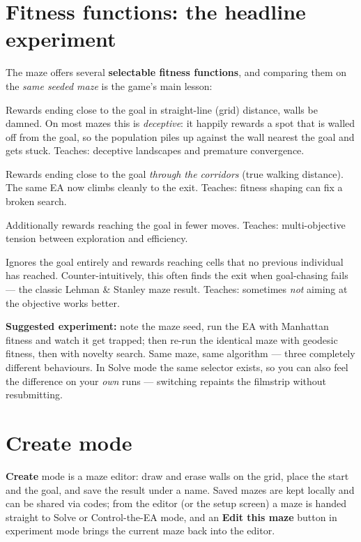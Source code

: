 \documentclass[11pt,a4paper]{report}
\newcommand{\uielem}[1]{\textsf{\textbf{#1}}} %
\begin{document}
\section{Fitness functions: the headline experiment}
\label{sec:maze-fitness}

The maze offers several \textbf{selectable fitness functions}, and comparing
them on the \emph{same seeded maze} is the game's main lesson:

\begin{description}[style=nextline]
  \item[Manhattan (naive objective)]
    Rewards ending close to the goal in straight-line (grid) distance,
    walls be damned. On most mazes this is \emph{deceptive}: it happily
    rewards a spot that is walled off from the goal, so the population
    piles up against the wall nearest the goal and gets stuck. Teaches:
    deceptive landscapes and premature convergence.
  \item[Geodesic (BFS field)]
    Rewards ending close to the goal \emph{through the corridors} (true
    walking distance). The same EA now climbs cleanly to the exit.
    Teaches: fitness shaping can fix a broken search.
  \item[Length penalty]
    Additionally rewards reaching the goal in fewer moves.
    Teaches: multi-objective tension between exploration and efficiency.
  \item[Novelty search]
    Ignores the goal entirely and rewards reaching cells that no previous
    individual has reached. Counter-intuitively, this often finds the exit
    when goal-chasing fails --- the classic Lehman \& Stanley maze result.
    Teaches: sometimes \emph{not} aiming at the objective works better.
\end{description}

\textbf{Suggested experiment:} note the maze seed, run the EA with Manhattan
fitness and watch it get trapped; then re-run the identical maze with
geodesic fitness, then with novelty search. Same maze, same algorithm ---
three completely different behaviours. In Solve mode the same selector
exists, so you can also feel the difference on your \emph{own} runs ---
switching repaints the filmstrip without resubmitting.

\section{Create mode}

\uielem{Create} mode is a maze editor: draw and erase walls on the grid,
place the start and the goal, and save the result under a name. Saved mazes
are kept locally and can be shared via codes; from the editor (or the setup
screen) a maze is handed straight to Solve or Control-the-EA mode, and an
\uielem{Edit this maze} button in experiment mode brings the current maze
back into the editor.
\end{document}
